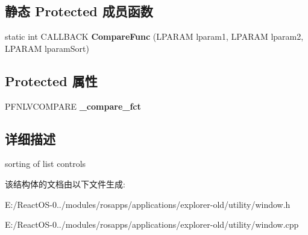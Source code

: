 \subsection*{静态 Protected 成员函数}
\begin{DoxyCompactItemize}
\item 
\mbox{\label{struct_list_sort_af0f9fbcc35e7e41c3c6ef04c865ef727}} 
static int C\+A\+L\+L\+B\+A\+CK {\bfseries Compare\+Func} (L\+P\+A\+R\+AM lparam1, L\+P\+A\+R\+AM lparam2, L\+P\+A\+R\+AM lparam\+Sort)
\end{DoxyCompactItemize}
\subsection*{Protected 属性}
\begin{DoxyCompactItemize}
\item 
\mbox{\label{struct_list_sort_ad953811d9ab5b47a5f8dedced3cae12d}} 
P\+F\+N\+L\+V\+C\+O\+M\+P\+A\+RE {\bfseries \+\_\+compare\+\_\+fct}
\end{DoxyCompactItemize}


\subsection{详细描述}
sorting of list controls 

该结构体的文档由以下文件生成\+:\begin{DoxyCompactItemize}
\item 
E\+:/\+React\+O\+S-\/0../modules/rosapps/applications/explorer-\/old/utility/window.\+h\item 
E\+:/\+React\+O\+S-\/0../modules/rosapps/applications/explorer-\/old/utility/window.\+cpp\end{DoxyCompactItemize}
